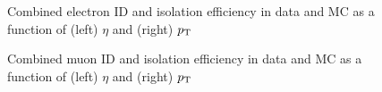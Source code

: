 \begin{figure}[h!]
\caption{Combined electron ID and isolation efficiency in data and MC as a
function of (left) $\eta$ and (right) $p_{\mathrm{T}}$}
\label{fig:electronIdIso}
\end{figure}

\begin{figure}[h!]
\caption{Combined muon ID and isolation efficiency in data and MC as a function
of (left) $\eta$ and (right) $p_{\mathrm{T}}$}
\label{fig:muonIdIso}
\end{figure}

